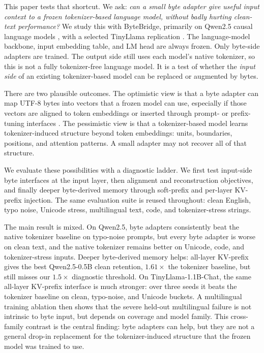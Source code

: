 \documentclass[runningheads]{llncs}
\newcommand{\bb}{ByteBridge}
\newcommand{\qwen}{Qwen2.5-0.5B}
\newcommand{\tinyllama}{TinyLlama-1.1B-Chat}
\begin{document}
This paper tests that shortcut. We ask: \emph{can a small byte adapter give useful input context to a frozen tokenizer-based language model, without badly hurting clean-text performance?} We study this with \bb{}, primarily on Qwen2.5 causal language models \cite{qwen2024technical}, with a selected TinyLlama replication \cite{zhang2024tinyllama}. The language-model backbone, input embedding table, and LM head are always frozen. Only byte-side adapters are trained. The output side still uses each model's native tokenizer, so this is not a fully tokenizer-free language model. It is a test of whether the \emph{input side} of an existing tokenizer-based model can be replaced or augmented by bytes.

There are two plausible outcomes. The optimistic view is that a byte adapter can map UTF-8 bytes into vectors that a frozen model can use, especially if those vectors are aligned to token embeddings or inserted through prompt- or prefix-tuning interfaces \cite{lester2021prompttuning,li2021prefixtuning}. The pessimistic view is that a tokenizer-based model learns tokenizer-induced structure beyond token embeddings: units, boundaries, positions, and attention patterns. A small adapter may not recover all of that structure.

We evaluate these possibilities with a diagnostic ladder. We first test input-side byte interfaces at the input layer, then alignment and reconstruction objectives, and finally deeper byte-derived memory through soft-prefix and per-layer KV-prefix injection. The same evaluation suite is reused throughout: clean English, typo noise, Unicode stress, multilingual text, code, and tokenizer-stress strings.

The main result is mixed. On Qwen2.5, byte adapters consistently beat the native tokenizer baseline on typo-noise prompts, but every byte adapter is worse on clean text, and the native tokenizer remains better on Unicode, code, and tokenizer-stress inputs. Deeper byte-derived memory helps: all-layer KV-prefix gives the best \qwen{} clean retention, $1.61\times$ the tokenizer baseline, but still misses our $1.5\times$ diagnostic threshold. On \tinyllama{}, the same all-layer KV-prefix interface is much stronger: over three seeds it beats the tokenizer baseline on clean, typo-noise, and Unicode buckets. A multilingual training ablation then shows that the severe held-out multilingual failure is not intrinsic to byte input, but depends on coverage and model family. This cross-family contrast is the central finding: byte adapters can help, but they are not a general drop-in replacement for the tokenizer-induced structure that the frozen model was trained to use.
\end{document}
